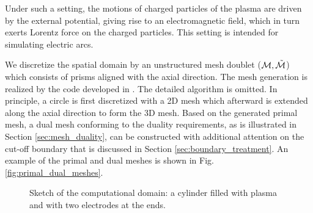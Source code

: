 \documentclass{report}
\begin{document}
Under such a setting, the motions of charged particles of the plasma are driven by the external potential, giving rise to an electromagnetic field, which in turn exerts Lorentz force on the charged particles. This setting is intended for simulating electric arcs.

We discretize the spatial domain by an unstructured mesh doublet ($\mathcal{M}, \Tilde{\mathcal{M}}$) which consists of prisms aligned with the axial direction. The mesh generation is realized by the code developed in \cite{fuchs_2021}. The detailed algorithm is omitted. In principle, a circle is first discretized with a 2D mesh which afterward is extended along the axial direction to form the 3D mesh. Based on the generated primal mesh, a dual mesh conforming to the duality requirements, as is illustrated in Section \ref{sec:mesh_duality}, can be constructed with additional attention on the cut-off boundary that is discussed in Section \ref{sec:boundary_treatment}. An example of the primal and dual meshes is shown in Fig. \ref{fig:primal_dual_meshes}.

\begin{figure}
    \centering
    \caption{Sketch of the computational domain: a cylinder filled with plasma and with two electrodes at the ends.}
    \label{fig:sketch_domain}
\end{figure}
\end{document}
